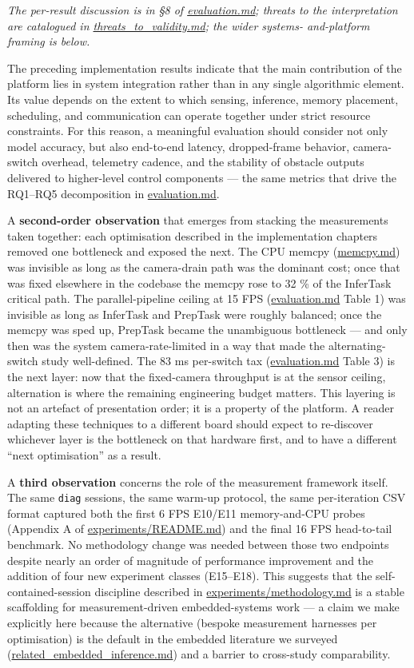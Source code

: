 \emph{The per-result discussion is in §8 of \url{evaluation.md}; threats
to the interpretation are catalogued in \url{threats_to_validity.md};
the wider systems- and-platform framing is below.}

The preceding implementation results indicate that the main contribution
of the platform lies in system integration rather than in any single
algorithmic element. Its value depends on the extent to which sensing,
inference, memory placement, scheduling, and communication can operate
together under strict resource constraints. For this reason, a
meaningful evaluation should consider not only model accuracy, but also
end-to-end latency, dropped-frame behavior, camera-switch overhead,
telemetry cadence, and the stability of obstacle outputs delivered to
higher-level control components --- the same metrics that drive the
RQ1--RQ5 decomposition in \url{evaluation.md}.

A \textbf{second-order observation} that emerges from stacking the
measurements taken together: each optimisation described in the
implementation chapters removed one bottleneck and exposed the next. The
CPU memcpy (\url{memcpy.md}) was invisible as long as the camera-drain
path was the dominant cost; once that was fixed elsewhere in the
codebase the memcpy rose to 32 \% of the InferTask critical path. The
parallel-pipeline ceiling at 15 FPS (\url{evaluation.md} Table 1) was
invisible as long as InferTask and PrepTask were roughly balanced; once
the memcpy was sped up, PrepTask became the unambiguous bottleneck ---
and only then was the system camera-rate-limited in a way that made the
alternating-switch study well-defined. The 83 ms per-switch tax
(\url{evaluation.md} Table 3) is the next layer: now that the
fixed-camera throughput is at the sensor ceiling, alternation is where
the remaining engineering budget matters. This layering is not an
artefact of presentation order; it is a property of the platform. A
reader adapting these techniques to a different board should expect to
re-discover whichever layer is the bottleneck on that hardware first,
and to have a different ``next optimisation'' as a result.

A \textbf{third observation} concerns the role of the measurement
framework itself. The same \texttt{diag} sessions, the same warm-up
protocol, the same per-iteration CSV format captured both the first 6
FPS E10/E11 memory-and-CPU probes (Appendix A of
\href{../experiments/README.md}{experiments/README.md}) and the final 16
FPS head-to-tail benchmark. No methodology change was needed between
those two endpoints despite nearly an order of magnitude of performance
improvement and the addition of four new experiment classes (E15--E18).
This suggests that the self-contained-session discipline described in
\href{../experiments/methodology.md}{experiments/methodology.md} is a
stable scaffolding for measurement-driven embedded-systems work --- a
claim we make explicitly here because the alternative (bespoke
measurement harnesses per optimisation) is the default in the embedded
literature we surveyed (\url{related_embedded_inference.md}) and a
barrier to cross-study comparability.

